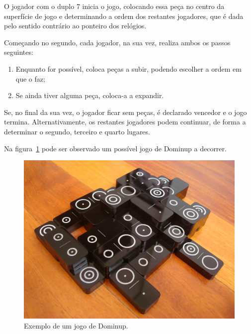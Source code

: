 \documentclass[a4paper]{article}
\begin{document}
O jogador com o duplo 7 inicia o jogo, colocando essa peça no centro da superfície de jogo e determinando a ordem dos restantes jogadores, que é dada pelo sentido contrário ao ponteiro dos relógios. 

Começando no segundo, cada jogador, na sua vez, realiza ambos os passos seguintes:
\begin{enumerate}
	\item Enquanto for possível, coloca peças a subir, podendo escolher a ordem em que o faz;
	\item Se ainda tiver alguma peça, coloca-a a expandir.
\end{enumerate}

Se, no final da sua vez, o jogador ficar sem peças, é declarado vencedor e o jogo termina. Alternativamente, os restantes jogadores podem continuar, de forma a determinar o segundo, terceiro e quarto lugares.

Na figura~\ref{example} pode ser observado um possível jogo de Dominup a decorrer.

\begin{figure}[h!]
\begin{center}
\includegraphics[scale=0.4]{example.jpg}
\caption{Exemplo de um jogo de Dominup.}
\label{example}
\end{center}
\end{figure}


\end{document}
